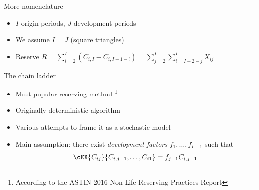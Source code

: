 \documentclass[tikz]{beamer}
\begin{document}
\begin{frame}{More nomenclature}
    \begin{itemize}
        \item $I$ origin periods, $J$ development periods
        \item We assume $I = J$ (square triangles)
        \item Reserve $R = \sum_{i = 2}^I (C_{i, I} - C_{i, I + 1 - i}) = \sum_{j = 2}^I \sum_{i = I + 2 - j}^I X_{ij}$
    \end{itemize}
\end{frame}

\begin{frame}{The chain ladder}
    \begin{itemize}
        \item Most popular reserving method \footnote{According to the ASTIN 2016 Non-Life Reserving Practices Report}
        \item Originally deterministic algorithm
        \item Various attempts to frame it as a stochastic model
        \item Main assumption: there exist \emph{development factors} $f_1, \dots, f_{I - 1}$ such that
              \begin{equation*}
                  \cEX{C_{ij}}{C_{i, j - 1}, \dots, C_{i1}} = f_{j - 1} C_{i, j - 1}
              \end{equation*}
    \end{itemize}
\end{frame}
\end{document}
